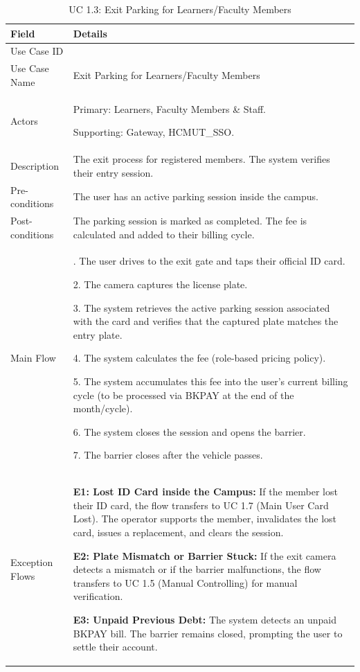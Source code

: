 \begin{table}[H]
\small
\renewcommand{\arraystretch}{1.4}
\begin{tabularx}{\textwidth}{|>{\raggedright\arraybackslash}p{3.5cm}|>{\RaggedRight\arraybackslash}X|}
\hline
\rowcolor{gray!20} \textbf{Field} & \textbf{Details} \\
\hline
Use Case ID & 1.3 \\
\hline
Use Case Name & Exit Parking for Learners/Faculty Members \\
\hline
Actors & Primary: Learners, Faculty Members \& Staff. \par Supporting: Gateway, HCMUT\_SSO. \\
\hline
Description & The exit process for registered members. The system verifies their entry session. \\
\hline
Pre-conditions & The user has an active parking session inside the campus. \\
\hline
Post-conditions & The parking session is marked as completed. The fee is calculated and added to their billing cycle. \\
\hline
Main Flow & 
1. The user drives to the exit gate and taps their official ID card. \par
2. The camera captures the license plate. \par
3. The system retrieves the active parking session associated with the card and verifies that the captured plate matches the entry plate. \par
4. The system calculates the fee (role-based pricing policy). \par
5. The system accumulates this fee into the user's current billing cycle (to be processed via BKPAY at the end of the month/cycle). \par
6. The system closes the session and opens the barrier. \par
7. The barrier closes after the vehicle passes. \\
\hline
Exception Flows & 
\textbf{E1: Lost ID Card inside the Campus:} If the member lost their ID card, the flow transfers to UC 1.7 (Main User Card Lost). The operator supports the member, invalidates the lost card, issues a replacement, and clears the session. \par \vspace{0.5em}
\textbf{E2: Plate Mismatch or Barrier Stuck:} If the exit camera detects a mismatch or if the barrier malfunctions, the flow transfers to UC 1.5 (Manual Controlling) for manual verification. \par \vspace{0.5em}
\textbf{E3: Unpaid Previous Debt:} The system detects an unpaid BKPAY bill. The barrier remains closed, prompting the user to settle their account. \\
\hline
\end{tabularx}
\caption{UC 1.3: Exit Parking for Learners/Faculty Members}
\label{tab:uc1.3}
\end{table}